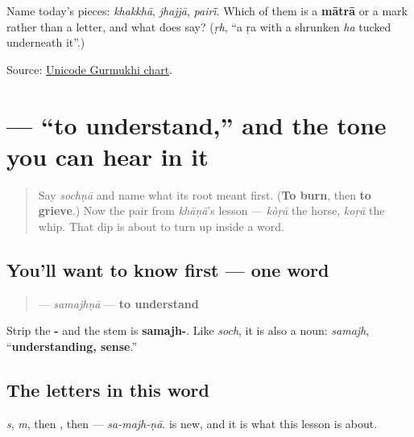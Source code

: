 \begin{tcolorbox}[breakable,colback=teal!4,colframe=teal!35!black,title={Before you move on}]
Name today's pieces: \emph{khakkhā}, \emph{jhajjā}, \emph{pairī̃}. Which of them is a \textbf{mātrā} or a mark rather than a letter, and what does \textbf{} say? (\emph{ṛh}, “a ṛa with a shrunken \emph{ha} tucked underneath it”.)

Source: \href{https://www.unicode.org/charts/PDF/U0A00.pdf}{Unicode Gurmukhi chart}.
\end{tcolorbox}
\section[\texorpdfstring{\pa{ਸਮਝਣਾ} (samajhṇā)}{ਸਮਝਣਾ (samajhṇā)}]{ — “to understand,” and the tone you can hear in it}

\label{lesson:PA-C08-samajhna}



\begin{quote}
Say \emph{sochṇā} and name what its root meant first. (\textbf{To burn}, then \textbf{to grieve}.) Now the pair from \emph{khāṇā}'s lesson — \emph{kòṛā} the horse, \emph{koṛā} the whip. That dip is about to turn up inside a word.
\end{quote}

\subsection*{You'll want to know first — one word}
\begin{quote}
\textbf{} — \emph{samajhṇā} — \textbf{to understand}
\end{quote}

Strip the \textbf{-} and the stem is \textbf{samajh-}. Like \emph{soch}, it is also a noun: \textbf{} \emph{samajh}, “\textbf{understanding, sense}.”

\subsection*{The letters in this word}
\textbf{} \emph{s}, \textbf{} \emph{m}, then \textbf{}, then \textbf{} — \emph{sa-majh-ṇā}. \textbf{} is new, and it is what this lesson is about.

